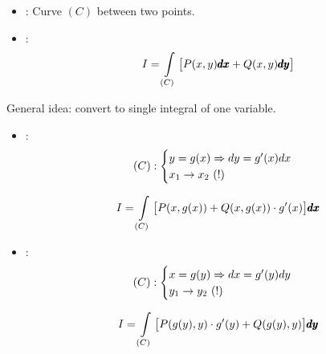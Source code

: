 \begin{multicols}{4}
\colbreak


      \begin{itemize}
        \item {}: Curve $(C)$ between two points.
        \item {}:
          \begin{equation*}
            I = \int \limits_{(C)} \big[P(x, y)\pmb{dx} + Q(x, y)\pmb{dy}\big]
          \end{equation*}
      \end{itemize}

      \par General idea: convert to single integral of one variable.
        \begin{itemize}
          \item {}:
            \begin{equation*}
              (C):
                \begin{cases}
                  y = g(x) \Rightarrow dy = g'(x)dx \\
                  x_{1} \to x_{2} \mbox{ (!) }
                \end{cases}
            \end{equation*}          

            \begin{equation}
              I = \int \limits_{(C)} \big[P(x, g(x)) + Q(x, g(x)) \cdot g'(x)\big] \pmb{dx}
            \end{equation}

          \item {}:
            \begin{equation*}
              (C):
                \begin{cases}
                  x = g(y) \Rightarrow dx = g'(y)dy \\
                  y_{1} \to y_{2} \mbox{ (!) }
                \end{cases}
            \end{equation*}

            \begin{equation}
              I = \int \limits_{(C)} \big[P(g(y), y) \cdot g'(y) + Q(g(y), y)\big] \pmb{dy}
            \end{equation}
        \end{itemize}


\end{multicols}
